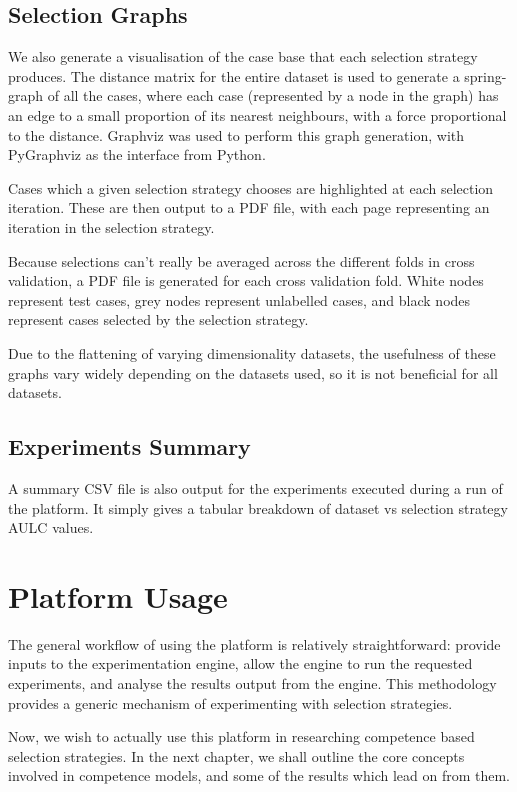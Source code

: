 \documentclass[a4paper,11pt]{report}
\begin{document}
\subsection{Selection Graphs}
We also generate a visualisation of the case base that each selection strategy produces. The distance matrix for the entire dataset is used to generate a spring-graph of all the cases, where each case (represented by a node in the graph) has an edge to a small proportion of its nearest neighbours, with a force proportional to the distance. Graphviz \citep{prog:graphviz} was used to perform this graph generation, with PyGraphviz \citep{prog:pygraphviz} as the interface from Python.

Cases which a given selection strategy chooses are highlighted at each selection iteration. These are then output to a PDF file, with each page representing an iteration in the selection strategy.

Because selections can't really be averaged across the different folds in cross validation, a PDF file is generated for each cross validation fold. White nodes represent test cases, grey nodes represent unlabelled cases, and black nodes represent cases selected by the selection strategy.

Due to the flattening of varying dimensionality datasets, the usefulness of these graphs vary widely depending on the datasets used, so it is not beneficial for all datasets.

\subsection{Experiments Summary}
A summary CSV file is also output for the experiments executed during a run of the platform. It simply gives a tabular breakdown of dataset vs selection strategy AULC values.

\section{Platform Usage}
The general workflow of using the platform is relatively straightforward: provide inputs to the experimentation engine, allow the engine to run the requested experiments, and analyse the results output from the engine. This methodology provides a generic mechanism of experimenting with selection strategies.

Now, we wish to actually use this platform in researching competence based selection strategies. In the next chapter, we shall outline the core concepts involved in competence models, and some of the results which lead on from them.
\end{document}
